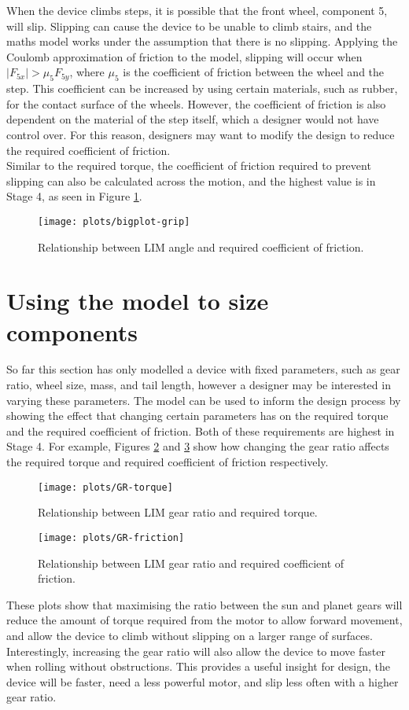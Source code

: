 When the device climbs steps, it is possible that the front wheel, component 5, will slip. Slipping can cause the device to be unable to climb stairs, and the maths model works under the assumption that there is no slipping. Applying the Coulomb approximation of friction to the model, slipping will occur when $|F_{5x}| > \mu_5 F_{5y}$, where $\mu_5$ is the coefficient of friction between the wheel and the step. This coefficient can be increased by using certain materials, such as rubber, for the contact surface of the wheels. However, the coefficient of friction is also dependent on the material of the step itself, which a designer would not have control over. For this reason, designers may want to modify the design to reduce the required coefficient of friction.\\
Similar to the required torque, the coefficient of friction required to prevent slipping can also be calculated across the motion, and the highest value is in Stage 4, as seen in Figure \ref{bigplot-grip}.

\begin{figure}[h]
	\centering
	\texttt{[image: plots/bigplot-grip]}
	\caption{Relationship between LIM angle and required coefficient of friction.}
	\label{bigplot-grip}
\end{figure}

\section{Using the model to size components}
So far this section has only modelled a device with fixed parameters, such as gear ratio, wheel size, mass, and tail length, however a designer may be interested in varying these parameters. The model can be used to inform the design process by showing the effect that changing certain parameters has on the required torque and the required coefficient of friction. Both of these requirements are highest in Stage 4. For example, Figures \ref{fig:GR-torque} and \ref{fig:GR-friction} show how changing the gear ratio affects the required torque and required coefficient of friction respectively.\\

\begin{figure}[h]
	\centering
	\texttt{[image: plots/GR-torque]}
	\caption{Relationship between LIM gear ratio and required torque.}
	\label{fig:GR-torque}
\end{figure}
\begin{figure}[h]
	\centering
	\texttt{[image: plots/GR-friction]}
	\caption{Relationship between LIM gear ratio and required coefficient of friction.}
	\label{fig:GR-friction}
\end{figure}
These plots show that maximising the ratio between the sun and planet gears will reduce the amount of torque required from the motor to allow forward movement, and allow the device to climb without slipping on a larger range of surfaces. Interestingly, increasing the gear ratio will also allow the device to move faster when rolling without obstructions. This provides a useful insight for design, the device will be faster, need a less powerful motor, and slip less often with a higher gear ratio.
